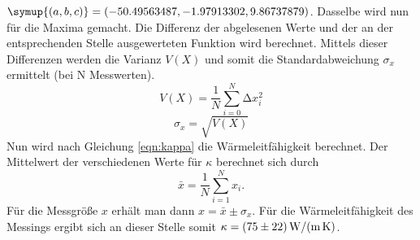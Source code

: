 $\symup{(a,b,c)}=(-50.49563487, -1.97913302, 9.86737879)$.
Dasselbe wird nun für die Maxima gemacht.
Die Differenz der abgelesenen Werte und der an der entsprechenden Stelle ausgewerteten Funktion wird berechnet. 
Mittels dieser Differenzen werden die Varianz $V(X)$ und somit die Standardabweichung $\sigma_x$ ermittelt (bei N Messwerten). 
\begin{equation*}
    V(X)= \frac{1}{N} \sum_{i=0}^N \increment x_i ^2
\end{equation*}
\begin{equation*}
    \sigma_x = \sqrt{V(X)} 
\end{equation*}
Nun wird nach Gleichung \eqref{eqn:kappa} die Wärmeleitfähigkeit berechnet. 
Der Mittelwert der verschiedenen Werte für $\kappa$ berechnet sich durch 
\begin{equation*}
\bar{x} = \frac{1}{N} \sum_{i=1}^N x_i .
\label{eqn:average}
\end{equation*}
Für die Messgröße $x$ erhält man dann $x = \bar{x} \pm \sigma_x$.
Für die Wärmeleitfähigkeit des Messings ergibt sich an dieser Stelle somit $\kappa = \SI{75 \pm 22}{\watt\per\meter\per\kelvin} $.

